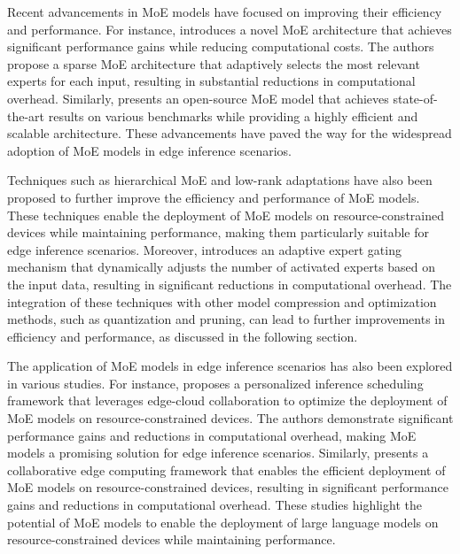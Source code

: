 \documentclass[11pt,a4paper]{article}
\begin{document}
Recent advancements in MoE models have focused on improving their efficiency and performance. For instance, \cite{arxiv:2112.06905} introduces a novel MoE architecture that achieves significant performance gains while reducing computational costs. The authors propose a sparse MoE architecture that adaptively selects the most relevant experts for each input, resulting in substantial reductions in computational overhead. Similarly, \cite{arxiv:2402.01739} presents an open-source MoE model that achieves state-of-the-art results on various benchmarks while providing a highly efficient and scalable architecture. These advancements have paved the way for the widespread adoption of MoE models in edge inference scenarios.

Techniques such as hierarchical MoE \cite{arxiv:2405.03133} and low-rank adaptations \cite{doi:10.1016/j.future.2025.108056} have also been proposed to further improve the efficiency and performance of MoE models. These techniques enable the deployment of MoE models on resource-constrained devices while maintaining performance, making them particularly suitable for edge inference scenarios. Moreover, \cite{doi:10.1145/3676536.3676741} introduces an adaptive expert gating mechanism that dynamically adjusts the number of activated experts based on the input data, resulting in significant reductions in computational overhead. The integration of these techniques with other model compression and optimization methods, such as quantization and pruning, can lead to further improvements in efficiency and performance, as discussed in the following section.

The application of MoE models in edge inference scenarios has also been explored in various studies. For instance, \cite{arxiv:2405.14636} proposes a personalized inference scheduling framework that leverages edge-cloud collaboration to optimize the deployment of MoE models on resource-constrained devices. The authors demonstrate significant performance gains and reductions in computational overhead, making MoE models a promising solution for edge inference scenarios. Similarly, \cite{arxiv:2405.14371} presents a collaborative edge computing framework that enables the efficient deployment of MoE models on resource-constrained devices, resulting in significant performance gains and reductions in computational overhead. These studies highlight the potential of MoE models to enable the deployment of large language models on resource-constrained devices while maintaining performance.
\end{document}
